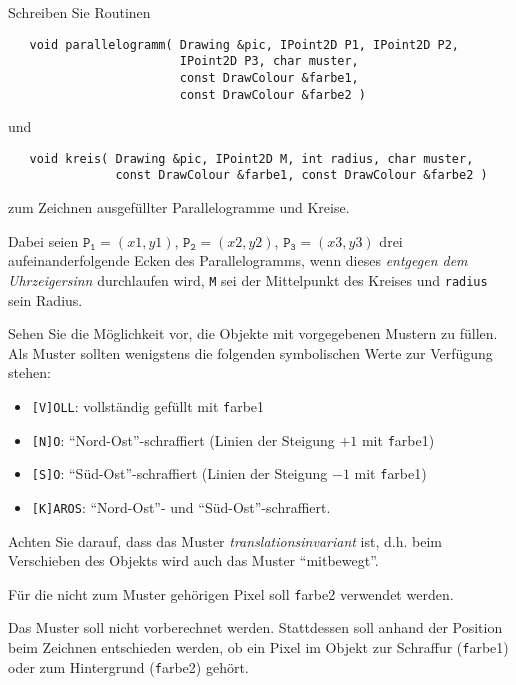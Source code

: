 %
Schreiben Sie Routinen
\begin{verbatim}
   void parallelogramm( Drawing &pic, IPoint2D P1, IPoint2D P2,
                        IPoint2D P3, char muster,
                        const DrawColour &farbe1,
                        const DrawColour &farbe2 )
\end{verbatim}
und
\begin{verbatim}
   void kreis( Drawing &pic, IPoint2D M, int radius, char muster,
               const DrawColour &farbe1, const DrawColour &farbe2 )
\end{verbatim}
zum Zeichnen ausgefüllter Parallelogramme und Kreise.

Dabei seien $\mathtt{P_{1}} = (x1, y1)$, $\mathtt{P_{2}} = (x2, y2)$, 
$\mathtt{P_{3}} = (x3, y3)$ drei aufeinanderfolgende Ecken des 
Parallelogramms, wenn dieses {\em entgegen dem Uhrzeigersinn\/} 
durchlaufen wird, \texttt{M} sei der Mittelpunkt des Kreises und 
\texttt{radius} sein Radius.

Sehen Sie die Möglichkeit vor, die Objekte mit vorgegebenen Mustern zu 
füllen. Als Muster sollten wenigstens die folgenden symbolischen Werte 
zur Verfügung stehen:
\begin{itemize}
  \item \texttt{[V]OLL}: vollständig gefüllt mit {\texttt farbe1}
  \item \texttt{[N]O}: "`Nord-Ost"'-schraffiert (Linien der Steigung 
        $+1$ mit {\texttt farbe1})
  \item \texttt{[S]O}: "`Süd-Ost"'-schraffiert (Linien der Steigung 
        $-1$ mit {\texttt farbe1})
  \item \texttt{[K]AROS}: "`Nord-Ost"'- und "`Süd-Ost"'-schraffiert.
\end{itemize}
Achten Sie darauf, dass das Muster {\em translationsinvariant\/} ist, 
d.h. beim Verschieben des Objekts wird auch das Muster "`mitbewegt"'.

Für die nicht zum Muster gehörigen Pixel soll {\texttt farbe2} verwendet 
werden.

Das Muster soll nicht vorberechnet werden. Stattdessen soll anhand der 
Position beim Zeichnen entschieden werden, ob ein Pixel im Objekt zur 
Schraffur ({\texttt farbe1}) oder zum Hintergrund ({\texttt farbe2}) 
gehört.

